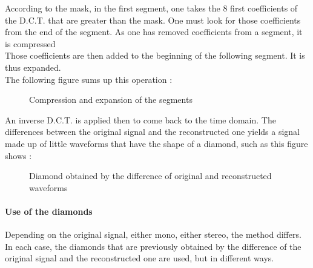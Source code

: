 According to the mask, in the first segment, one takes the 8 first coefficients of the D.C.T. that are greater than the mask. One must look for those coefficients from the end of the segment. As one has removed coefficients from a segment, it is compressed\\
Those coefficients are then added to the beginning of the following segment. It is thus expanded.\\
The following figure sums up this operation :
\begin{figure}[H]
\caption{\label{compression-expansion} Compression and expansion of the segments}
\end{figure}

An inverse D.C.T. is applied then to come back to the time domain. The differences between the original signal and the reconstructed one yields a signal made up of little waveforms that have the shape of a diamond, such as this figure shows :
\begin{figure}[H]
\caption{\label{diamond} Diamond obtained by the difference of original and reconstructed waveforms}
\end{figure}

\paragraph{Use of the diamonds}
Depending on the original signal, either mono, either stereo, the method differs. In each case, the diamonds that are previously obtained by the difference of the original signal and the reconstructed one are used, but in different ways.

